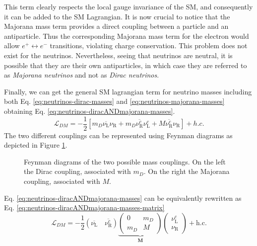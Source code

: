 This term clearly respects the local gauge invariance of the \ac{SM}, and consequently it can be added to the \ac{SM} Lagrangian. 
It is now crucial to notice that the Majorana mass term provides a direct coupling between a particle and an antiparticle. 
Thus the corresponding Majorana mass term for the electron would allow $e^+ \leftrightarrow e^-$ transitions, violating charge conservation. 
This problem does not exist for the neutrinos. Nevertheless, seeing that neutrinos are neutral, it is possible that they are their own 
antiparticles, in which case they are referred to as \textit{Majorana neutrinos} and not as \textit{Dirac neutrinos}.

Finally, we can get the general \ac{SM} lagrangian term for neutrino masses including both Eq. \ref{eq:neutrinos-dirac-masses} 
and \ref{eq:neutrinos-majorana-masses} obtaining Eq. \ref{eq:neutrinos-diracANDmajorana-masses}.
\begin{equation}
    \label{eq:neutrinos-diracANDmajorana-masses}
    \mathcal{L}_{DM} = -\frac{1}{2} \left[ m_D \overline{\nu_\text{L}}\nu_\text{R} + m_D \overline{\nu_\text{R}^c}\nu_\text{L}^c + M \overline{\nu_\text{R}^c}\nu_\text{R} \right] + h.c.
\end{equation}
The two different couplings can be represented using Feynman diagrams as depicted in Figure \ref{fig:feynman-massCouplings}.
\begin{figure}[H]
    \centering
    
    \caption{Feynman diagrams of the two possible mass couplings. On the left the Dirac coupling, associated with $m_D$. On the right the Majorana coupling, associated with $M$.}
    \label{fig:feynman-massCouplings}
\end{figure}

Eq. \ref{eq:neutrinos-diracANDmajorana-masses} can be equivalently rewritten as Eq. \ref{eq:neutrinos-diracANDmajorana-masses-matrix}
\begin{equation}
    \label{eq:neutrinos-diracANDmajorana-masses-matrix}
    \mathcal{L}_{DM} = -\frac{1}{2} \left( \overline{\nu_\text{L}} \quad \overline{\nu_\text{R}^c} \right) \underbrace{\begin{pmatrix} 0 & m_D \\ m_D & M \end{pmatrix}}_{\mathbf{M}} \begin{pmatrix} \nu_\text{L}^c \\ \nu_\text{R} \end{pmatrix} + \text{h.c.}
\end{equation}

